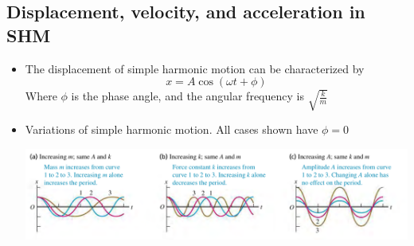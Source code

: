 \documentclass[11pt, a4paper]{article}
\begin{document}
\subsection{Displacement, velocity, and acceleration in SHM}
\begin{itemize}
    \item The displacement of simple harmonic motion can be characterized by
        \begin{equation}
            x = A\cos(\omega{}t + \phi)
        \end{equation}
        Where $\phi$ is the phase angle, and the angular frequency is $\sqrt{\frac{k}{m}}$
    \item Variations of simple harmonic motion. All cases shown have $\phi = 0$

\includegraphics[scale=0.65]{images/shm.png}


\end{itemize}
\end{document}
